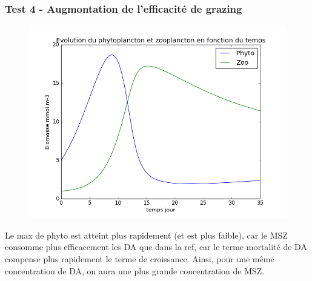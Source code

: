 {\subsubsection{Test 4 - Augmontation de l'efficacité de grazing}
\begin{figure}
  \includegraphics[width=\textwidth]{partie1/test4x35.png}
  \caption{\todo}
  \label{fig:partie1t4}
\end{figure}
\par{
Le max de phyto est atteint plus rapidement (et est plus faible), car le MSZ consomme plus efficacement
les DA que dans la ref, car le terme mortalité de DA compense plus rapidement le terme de croissance.
Ainsi, pour une même concentration de DA, on aura une plus grande concentration de MSZ.
}
\FloatBarrier

\clearpage
}

